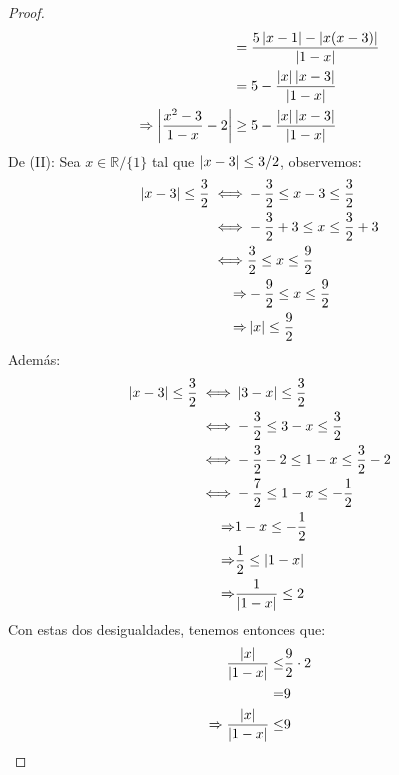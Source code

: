 \documentclass[12pt]{article}
\begin{document}
\begin{enumerate}
\begin{proof}
\begin{equation*}
\begin{split}
                &=\frac{5\left| x-1 \right|-\left| x(x-3) \right|}{\left| 1-x \right|}\\
                &=5-\frac{\left| x \right|\left| x-3 \right|}{\left| 1-x \right|}\\
                \Rightarrow \left| \frac{x^2-3}{1-x}-2 \right|&\geq5-\frac{\left| x \right|\left| x-3 \right|}{\left| 1-x \right|}
            \end{split}
        \end{equation*}
        De (II): Sea $x\in\mathbb{R}/\{1\}$ tal que $\left| x-3 \right|\leq3/2$, observemos:
        \begin{equation*}
            \begin{split}
                \left| x-3 \right|\leq\frac{3}{2}\iff&-\frac{3}{2}\leq x-3\leq\frac{3}{2}\\
                \iff&-\frac{3}{2}+3\leq x\leq\frac{3}{2}+3\\
                \iff&\frac{3}{2}\leq x\leq\frac{9}{2}\\
                \Rightarrow& -\frac{9}{2}\leq x\leq\frac{9}{2}\\
                \Rightarrow& \left| x \right|\leq\frac{9}{2}
            \end{split}
        \end{equation*}
        Además:
        \begin{equation*}
            \begin{split}
                \left| x-3 \right|\leq\frac{3}{2}\iff&\left| 3-x \right|\leq\frac{3}{2}\\
                \iff&-\frac{3}{2}\leq 3-x\leq\frac{3}{2}\\
                \iff&-\frac{3}{2}-2\leq 1-x\leq\frac{3}{2}-2\\
                \iff&-\frac{7}{2}\leq 1-x\leq-\frac{1}{2}\\
                \Rightarrow&1-x\leq-\frac{1}{2}\\
                \Rightarrow&\frac{1}{2}\leq\left| 1-x \right|\\
                \Rightarrow&\frac{1}{\left| 1-x \right|}\leq2
            \end{split}
        \end{equation*}
        Con estas dos desigualdades, tenemos entonces que:
        \begin{equation*}
            \begin{split}
                \frac{\abs{x}}{\abs{1-x}}\leq&\frac{9}{2}\cdot2\\
                =&9\\
                \Rightarrow\frac{\abs{x}}{\abs{1-x}}\leq&9
            \end{split}

\end{equation*}
\end{proof}
\end{enumerate}
\end{document}
